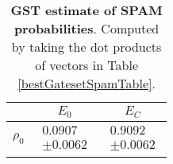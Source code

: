 \documentclass{article}[11pt]
\begin{document}
\begin{table}[h]
\begin{center}
\begin{tabular}[l]{|c|c|c|}
\hline
 & $E_{0}$ & $E_C$ \\ \hline
$\rho_{0}$ & $ \begin{array}{c} 0.0907 \\ \pm 0.0062 \end{array} $ & $ \begin{array}{c} 0.9092 \\ \pm 0.0062 \end{array} $ \\ \hline
\end{tabular}

\caption{\textbf{GST estimate of SPAM probabilities}.  Computed by taking the dot products of vectors in Table \ref{bestGatesetSpamTable}.\label{bestGatesetSpamParametersTable}}
\end{center}
\end{table}
\end{document}
